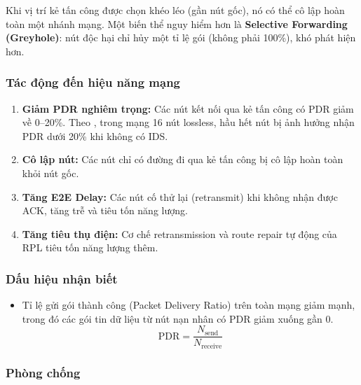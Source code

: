 Khi vị trí kẻ tấn công được chọn khéo léo (gần nút gốc), nó có thể cô
lập hoàn toàn một nhánh mạng. Một biến thể nguy hiểm hơn là
\textbf{Selective Forwarding (Greyhole)}: nút độc hại chỉ hủy một tỉ lệ
gói (không phải 100\%), khó phát hiện hơn.

\subsubsection{Tác động đến hiệu năng mạng}

\begin{enumerate}
    \item \textbf{Giảm PDR nghiêm trọng:} Các nút kết nối qua kẻ tấn
          công có PDR giảm về 0--20\%. Theo \cite{sharma2022blackhole},
          trong mạng 16 nút lossless, hầu hết nút bị ảnh hưởng nhận
          PDR dưới 20\% khi không có IDS.

    \item \textbf{Cô lập nút:} Các nút chỉ có đường đi qua kẻ tấn
          công bị cô lập hoàn toàn khỏi nút gốc.

    \item \textbf{Tăng E2E Delay:} Các nút cố thử lại (retransmit) khi
          không nhận được ACK, tăng trễ và tiêu tốn năng lượng.

    \item \textbf{Tăng tiêu thụ điện:} Cơ chế retransmission và route
          repair tự động của RPL tiêu tốn năng lượng thêm.
\end{enumerate}

\subsubsection{Dấu hiệu nhận biết}

\begin{itemize}
    \item Tỉ lệ gửi gói thành công (Packet Delivery Ratio) trên toàn mạng giảm mạnh, trong đó các gói tin dữ liệu từ nút nạn nhân có PDR giảm xuống gần 0.
          \begin{equation}
              \text{PDR} = \frac{N_{\text{send}}}{N_{\text{receive}}}
              \label{eq:pdr}
          \end{equation}
\end{itemize}

\subsubsection{Phòng chống}

